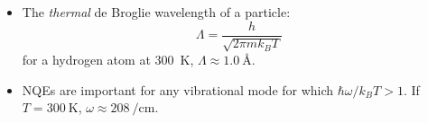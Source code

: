 \begin{frame}
\begin{itemize}
    
    \item The \emph{thermal} de Broglie wavelength of a particle:
    $$
    \Lambda = \frac{h}{\sqrt{2\pi m k_B T}}
    $$
    for a hydrogen atom at \SI{300}{\kelvin}, $\Lambda \approx \SI{1.0}{\angstrom}$.

    \item NQEs are important for any vibrational mode for which 
    $\hbar\omega /k_B T > 1$. If $T = \SI{300}{\kelvin}$, $\omega \approx \SI{208}{\per\cm}$.
  \end{itemize}
\end{frame}
